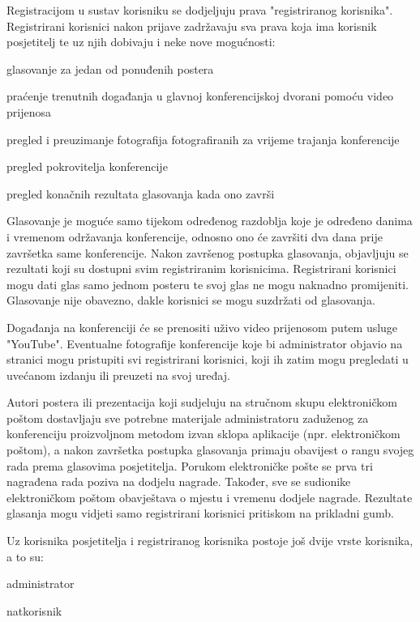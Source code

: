 		Registracijom u sustav korisniku se dodjeljuju prava "registriranog korisnika". 
		Registrirani korisnici nakon prijave zadržavaju sva prava koja ima korisnik posjetitelj te uz njih dobivaju i neke nove mogućnosti:
		\begin{packed_item}
			\item glasovanje za jedan od ponuđenih postera
			\item praćenje trenutnih događanja u glavnoj konferencijskoj dvorani pomoću video prijenosa
			\item pregled i preuzimanje fotografija fotografiranih za vrijeme trajanja konferencije
			\item pregled pokrovitelja konferencije
			\item pregled konačnih rezultata glasovanja kada ono završi
		\end{packed_item}
		
		Glasovanje je moguće samo tijekom određenog razdoblja koje je određeno danima i vremenom održavanja konferencije, odnosno ono će završiti dva dana prije završetka same konferencije. Nakon završenog postupka glasovanja, objavljuju se rezultati koji su dostupni svim registriranim korisnicima. Registrirani korisnici mogu dati glas samo jednom posteru te svoj glas ne mogu naknadno promijeniti. Glasovanje nije obavezno, dakle korisnici se mogu suzdržati od glasovanja.  
		
		Događanja na konferenciji će se prenositi uživo video prijenosom putem usluge "YouTube". Eventualne fotografije konferencije koje bi administrator objavio na stranici mogu pristupiti svi registrirani korisnici, koji ih zatim mogu pregledati u uvećanom izdanju ili preuzeti na svoj uređaj.
		
		Autori postera ili prezentacija koji sudjeluju na stručnom skupu elektroničkom poštom dostavljaju sve potrebne materijale administratoru zaduženog za konferenciju proizvoljnom metodom izvan sklopa aplikacije (npr. elektroničkom poštom), a nakon završetka postupka glasovanja primaju obavijest o rangu svojeg rada prema glasovima posjetitelja. Porukom elektroničke pošte se prva tri nagrađena rada poziva na dodjelu nagrade. Također, sve se sudionike elektroničkom poštom obavještava o mjestu i vremenu dodjele nagrade. Rezultate glasanja mogu vidjeti samo registrirani korisnici pritiskom na prikladni gumb.
		
		\newpage
		
		Uz korisnika posjetitelja i registriranog korisnika postoje još dvije vrste korisnika, a to su:
		\begin{packed_item}
			\item administrator
			\item natkorisnik
		\end{packed_item}
		

